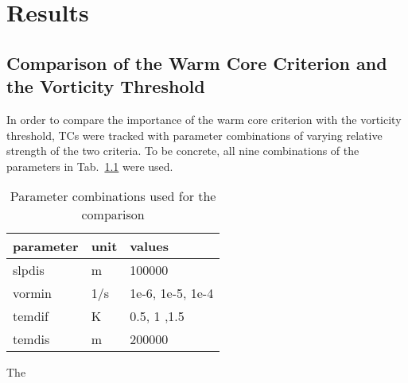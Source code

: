 \chapter{Results}\label{sec:results}

\section{Comparison of the Warm Core Criterion and the Vorticity Threshold}
In order to compare the importance of the warm core criterion with the vorticity threshold, TCs were tracked with parameter combinations of varying relative strength of the two criteria. To be concrete, all nine combinations of the parameters in Tab.~\ref{tab:vor-tem-comparison} were used.

\begin{table}[ht]
	\centering
	\begin{tabular}{|l|l|l|}
		\hline
		\textbf{parameter} & \textbf{unit} & \textbf{values}        \\ \hline
		slpdis             & m             & 100000   \\
		vormin             & 1/s           & 1e-6, 1e-5, 1e-4       \\
		temdif             & K             & 0.5, 1 ,1.5       \\
		temdis             & m             & 200000 \\ \hline
	\end{tabular}
	\caption{Parameter combinations used for the comparison}
	\label{tab:vor-tem-comparison}
\end{table}

The 



